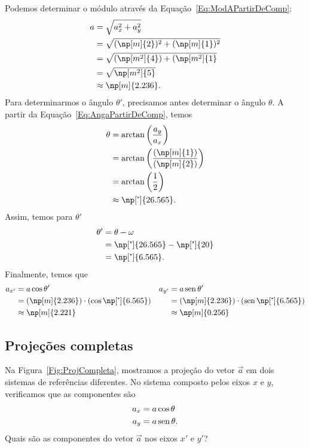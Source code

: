 Podemos determinar o módulo através da Equação~\eqref{Eq:ModAPartirDeComp}:
\begin{align}
    a &= \sqrt{a_x^2 + a_y^2} \\
    &= \sqrt{(\np[m]{2})^2 + (\np[m]{1})^2} \\
    &= \sqrt{(\np[m^2]{4}) + (\np[m^2]{1}} \\
    &= \sqrt{\np[m^2]{5}} \\
    &\approx \np[m]{2.236}.
\end{align}
%
Para determinarmos o ângulo $\theta'$, precisamos antes determinar o ângulo $\theta$. A partir da Equação~\eqref{Eq:AngaPartirDeComp}, temos
\begin{align}
    \theta &= \arctan\left(\frac{a_y}{a_x}\right) \\
    &= \arctan\left(\frac{(\np[m]{1})}{(\np[m]{2})}\right) \\
    &=\arctan\left(\frac{1}{2}\right) \\
    &\approx \np[\tcdegree]{26.565}.
\end{align}
%
Assim, temos para $\theta'$
\begin{align}
    \theta' &= \theta - \omega \\
    &= \np[\tcdegree]{26.565} - \np[\tcdegree]{20} \\
    &= \np[\tcdegree]{6.565}.
\end{align}
%
Finalmente, temos que
\begin{align}
    a_{x'} &= a\cos\theta' & a_{y'} &= a\sen\theta' \\
    &= (\np[m]{2.236})\cdot(\cos\np[\tcdegree]{6.565}) & &= (\np[m]{2.236})\cdot(\sen\np[\tcdegree]{6.565}) \\
    &\approx \np[m]{2.221} & &\approx \np[m]{0.256}
\end{align}

\subsection{Projeções completas}

Na Figura~\ref{Fig:ProjCompleta}, mostramos a projeção do vetor $\vec{a}$ em dois sistemas de referências diferentes. No sistema composto pelos eixos $x$ e $y$, verificamos que as componentes são
\begin{align}
    a_x &= a \cos\theta \\
    a_y &= a \operatorname{sen}\theta.
\end{align}
%
Quais são as componentes do vetor $\vec{a}$ nos eixos $x'$ e $y'$?

